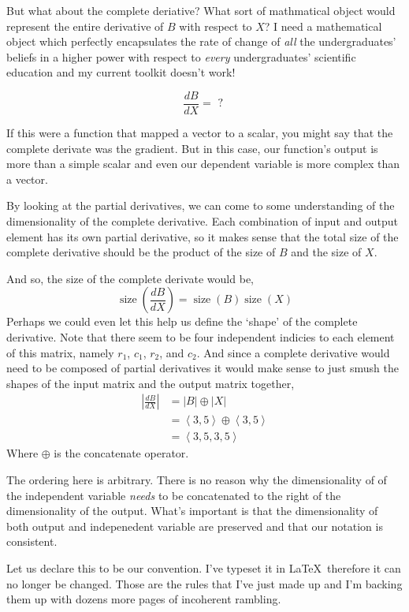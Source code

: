 \documentclass[12pt]{book}
\theoremstyle{plain}
\theoremstyle{definition}
\theoremstyle{ppart}
\theoremstyle{case}
\theoremstyle{solution}
\DeclareMathOperator{\size}{size}
\newcommand{\shape}[1]{\left|#1\right|}
\begin{document}
But what about the complete deriative?
What sort of mathmatical object would represent the entire derivative
of $B$ with respect to $X$?
I need a mathematical object which perfectly
encapsulates the rate of change of \textit{all} the undergraduates' beliefs in a
higher power with respect to \textit{every} undergraduates' scientific education
and my current toolkit doesn't work!

\[\frac{dB}{dX} = \mbox{ ? }\]

If this were a function that mapped a vector to a scalar, you might say that the
complete derivate was the gradient. But in this case, our function's output is more
than a simple scalar and even our dependent variable is more complex than a vector.

By looking at the partial derivatives, we can come to some understanding of the
dimensionality of the complete derivative. Each combination of input and output
element has its own partial derivative, so it makes sense that the total size
of the complete derivative should be the product of the size of $B$ and the size
of $X$.

And so, the size of the complete derivate would be,
\[
\size\left(\frac{dB}{dX}\right) = \size(B) \size(X)
\]
Perhaps we could even let this help us define the `shape' of the complete
derivative. Note that there seem to be four independent indicies to each element
of this matrix, namely $r_1$, $c_1$, $r_2$, and $c_2$.
And since a complete derivative would need to be composed of partial derivatives
it would make sense to just smush the shapes of the input matrix and the output
matrix together,
\begin{align*}
\shape{\frac{dB}{dX}} &= \shape{B} \oplus \shape{X} \\
 &= \left< 3, 5 \right> \oplus \left< 3, 5 \right> \\
 &= \left< 3, 5, 3, 5 \right>
\end{align*}
Where $\oplus$ is the concatenate operator.

The ordering here is arbitrary. There is no reason why the dimensionality of
of the independent variable \textit{needs} to be concatenated to the right of the
dimensionality of the output. What's important is that the dimensionality of
both output and indepenedent variable are preserved and that our notation is
consistent.

Let us declare this to
be our convention. I've typeset it in \LaTeX ~therefore it can no longer be
changed. Those are the rules that I've just made up and I'm backing them up with
dozens more pages of incoherent rambling.
\end{document}
